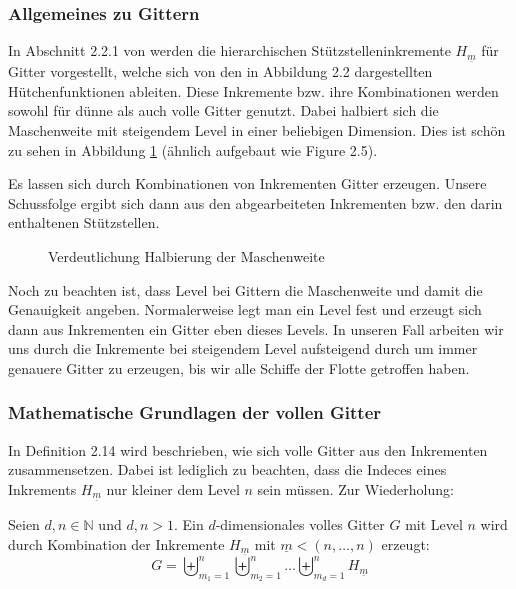 \documentclass[a4paper,12pt]{llncs}
\numberwithin{equation}{section}
\begin{document}
\subsubsection{Allgemeines zu Gittern}

In Abschnitt 2.2.1 von \cite{M13} werden die hierarchischen Stützstelleninkremente $H_{\underline{m}}$ für Gitter vorgestellt, welche sich von den in \cite{M13} Abbildung 2.2 dargestellten Hütchenfunktionen ableiten. Diese Inkremente bzw. ihre Kombinationen werden sowohl für dünne als auch volle Gitter genutzt. Dabei halbiert sich die Maschenweite mit steigendem Level in einer beliebigen Dimension. Dies ist schön zu sehen in Abbildung \ref{fig:gitter01} (ähnlich aufgebaut wie \cite{P10} Figure 2.5).

Es lassen sich durch Kombinationen von Inkrementen Gitter erzeugen. Unsere Schussfolge ergibt sich dann aus den abgearbeiteten Inkrementen bzw. den darin enthaltenen Stützstellen. 

\begin{figure}
	\centering
	\resizebox{90mm}{!}{}
	\caption{Verdeutlichung Halbierung der Maschenweite}
	\label{fig:gitter01}
\end{figure}


Noch zu beachten ist, dass Level bei Gittern die Maschenweite und damit die Genauigkeit angeben. Normalerweise legt man ein Level fest und erzeugt sich dann aus Inkrementen ein Gitter eben dieses Levels. In unseren Fall arbeiten wir uns durch die Inkremente bei steigendem Level aufsteigend durch um immer genauere Gitter zu erzeugen, bis wir alle Schiffe der Flotte getroffen haben.

\subsubsection{Mathematische Grundlagen der vollen Gitter}

In \cite{M13} Definition 2.14 wird beschrieben, wie sich volle Gitter aus den Inkrementen zusammensetzen. Dabei ist lediglich zu beachten, dass die Indeces eines Inkrements $H_{\underline{m}}$ nur kleiner dem Level $n$ sein müssen.  Zur Wiederholung:

\begin{definition}
	Seien $d,n\in\mathbb{N}$ und $d,n>1$. Ein $d$-dimensionales volles Gitter $G$ mit Level $n$ wird durch Kombination der Inkremente $H_{\underline{m}}$ mit $\underline{m}<(n,\dots,n)$ erzeugt:
	\begin{equation}
		G=\biguplus_{m_1=1}^n\biguplus_{m_2=1}^n\dots \biguplus_{m_d=1}^n H_{\underline{m}}
	\end{equation}
\end{definition}
\end{document}
